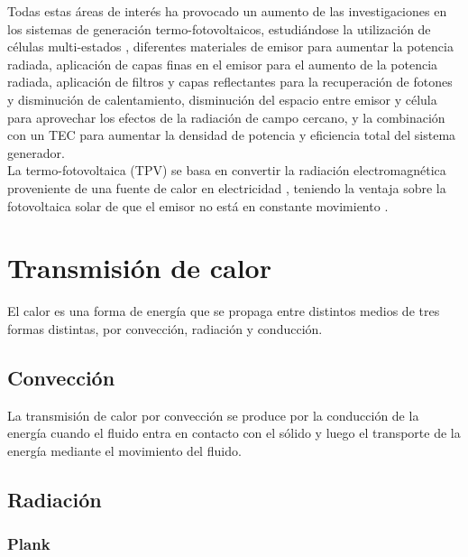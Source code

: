 Todas estas áreas de interés ha provocado un aumento de las investigaciones en los sistemas de generación termo-fotovoltaicos, estudiándose la utilización de células multi-estados \cite{MultiEstados_Capas_TPVs}, diferentes materiales de emisor para aumentar la potencia radiada, aplicación de capas finas en el emisor para el aumento de la potencia radiada\cite{doi:Near_field_ThinFilm}, aplicación de filtros \cite{multiLayerFilters} y capas reflectantes para la recuperación de fotones y disminución de calentamiento\cite{Thermoionic_nTPV_DATAS201910}, disminución del espacio entre emisor y célula para aprovechar los efectos de la radiación de campo cercano\cite{thermoionic_TPV_NF,modelEfficiency_NF_TPV,doi:NearField_200nm,nf_TPV_Pillars_SiO2}, y la combinación con un TEC para aumentar la densidad de potencia y eficiencia total del sistema generador\cite{thermoionic_TPV_NF,progress_Thermoionic_TPV,Thermoionic_nTPV_DATAS201910}.\\

La termo-fotovoltaica (TPV) se basa en convertir la radiación electromagnética proveniente de una fuente de calor en electricidad \cite{ThermophotovolticEnergyConversion_DATAS2021285}, teniendo la ventaja sobre la fotovoltaica solar de que el emisor no está en constante movimiento \cite{ThermophotovolticEnergyConversion_DATAS2021285}.\\



\section{Transmisión de calor}
El calor es una forma de energía que se propaga entre distintos medios de tres formas distintas, por convección, radiación y conducción.
\subsection{Convección}
La transmisión de calor por convección se produce por la conducción de la energía cuando el fluido entra en contacto con el sólido y luego el transporte de la energía mediante el movimiento del fluido.
\subsection{Radiación}

\subsubsection{Plank}
